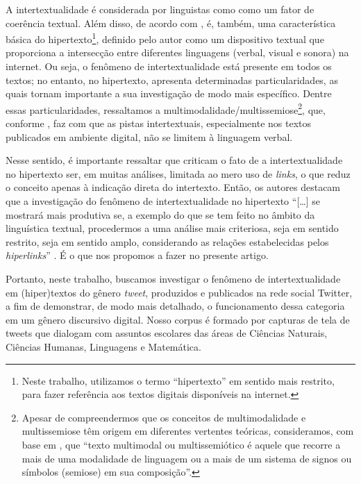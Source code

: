 \documentclass{textolivre}
\begin{document}
A intertextualidade é considerada por linguistas como \textcite{koch_coerencia_2015} como um fator de coerência textual. Além disso, de acordo com \textcite{xavier_desafio_2015}, é, também, uma característica básica do hipertexto\footnote{Neste trabalho, utilizamos o termo “hipertexto” em sentido mais restrito, para fazer referência aos textos digitais disponíveis na internet.}, definido pelo autor como um dispositivo textual que proporciona a intersecção entre diferentes linguagens (verbal, visual e sonora) na internet. Ou seja, o fenômeno de intertextualidade está presente em todos os textos; no entanto, no hipertexto, apresenta determinadas particularidades, as quais tornam importante a sua investigação de modo mais específico. Dentre essas particularidades, ressaltamos a multimodalidade/multissemiose\footnote{Apesar de compreendermos que os conceitos de multimodalidade e multissemiose têm origem em diferentes vertentes teóricas, consideramos, com base em \textcite[p. 108]{rojo_hipermodernidade_2015}, que “texto multimodal ou multissemiótico é aquele que recorre a mais de uma modalidade de linguagem ou a mais de um sistema de signos ou símbolos (semiose) em sua composição”.}, que, conforme \textcite{garcia_intertextualidade_2020}, faz com que as pistas intertextuais, especialmente nos textos publicados em ambiente digital, não se limitem à linguagem verbal.

Nesse sentido, é importante ressaltar que \textcite{araujo_consideracoes_2009} criticam o fato de a intertextualidade no hipertexto ser, em muitas análises, limitada ao mero uso de \textit{links}, o que reduz o conceito apenas à indicação direta do intertexto. Então, os autores destacam que a investigação do fenômeno de intertextualidade no hipertexto “[…] se mostrará mais produtiva se, a exemplo do que se tem feito no âmbito da linguística textual, procedermos a uma análise mais criteriosa, seja em sentido restrito, seja em sentido amplo, considerando as relações estabelecidas pelos \textit{hiperlinks}” \cite[p. 579, grifo dos autores]{araujo_consideracoes_2009}. É o que nos propomos a fazer no presente artigo.

Portanto, neste trabalho, buscamos investigar o fenômeno de intertextualidade em (hiper)textos do gênero \textit{tweet}, produzidos e publicados na rede social Twitter, a fim de demonstrar, de modo mais detalhado, o funcionamento dessa categoria em um gênero discursivo digital. Nosso corpus é formado por capturas de tela de tweets que dialogam com assuntos escolares das áreas de Ciências Naturais, Ciências Humanas, Linguagens e Matemática.
\end{document}
